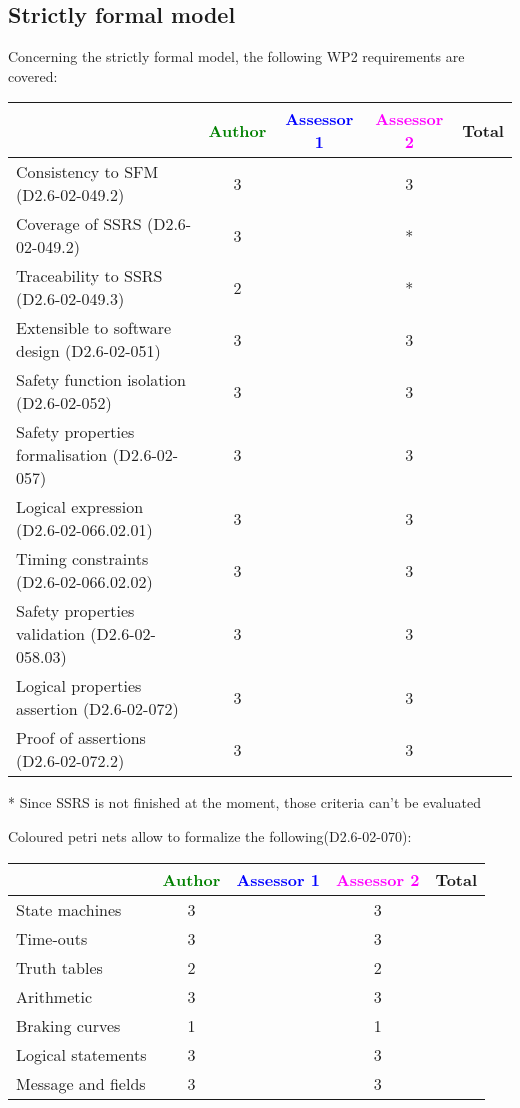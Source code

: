 \subsection{Strictly formal model}

Concerning the strictly formal model, the following WP2 requirements are covered:

\begin{tabular}{|l | c | c | c | c|}
\hline
& \textcolor{green}{Author} & \textcolor{blue}{Assessor 1} & \textcolor{magenta}{Assessor 2} & Total \\
\hline 
Consistency to SFM (D2.6-02-049.2) & 3 & & 3 &  \\
\hline
Coverage of SSRS (D2.6-02-049.2)  & 3 & & * &  \\
\hline
Traceability to  SSRS (D2.6-02-049.3)  & 2 & & * &  \\
\hline
Extensible to software design (D2.6-02-051)  & 3 & & 3 &  \\
\hline
Safety function isolation (D2.6-02-052)  & 3 & & 3 &  \\
\hline 
Safety properties formalisation (D2.6-02-057)  & 3 & & 3 &  \\
\hline
Logical expression (D2.6-02-066.02.01)  & 3 & & 3 &  \\
\hline
Timing constraints (D2.6-02-066.02.02)  & 3 & & 3 &  \\
\hline
Safety properties validation (D2.6-02-058.03)  & 3 & & 3 &  \\
\hline
Logical properties assertion (D2.6-02-072)  & 3 & & 3 &  \\
\hline
Proof of assertions (D2.6-02-072.2)  & 3 & & 3 &  \\
\hline
\end{tabular}

\begin{assessor2}
* Since SSRS is not finished at the moment, those criteria can't be evaluated
\end{assessor2}

Coloured petri nets allow to formalize the following(D2.6-02-070):

\begin{tabular}{|l | c | c | c | c|}
\hline
& \textcolor{green}{Author} & \textcolor{blue}{Assessor 1} & \textcolor{magenta}{Assessor 2} & Total \\
\hline 
State machines  & 3 & & 3 &  \\
\hline
Time-outs  & 3 & & 3 &  \\
\hline
Truth tables  & 2 & & 2 &  \\
\hline
Arithmetic  & 3 & & 3 &  \\
\hline
Braking curves  & 1 & & 1 &  \\
\hline
Logical statements & 3 & & 3 &  \\
\hline
Message and fields & 3 & & 3 &  \\
\hline
\end{tabular}

